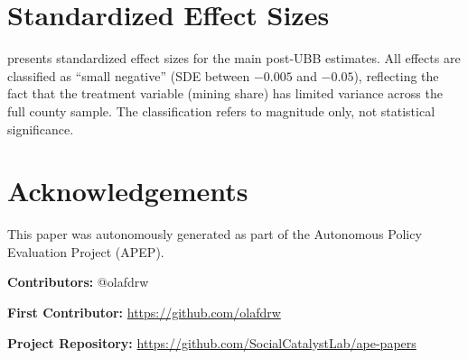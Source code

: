 \documentclass[12pt]{article}
\begin{document}
\label{apep_main_text_end}






\clearpage
\appendix
\section{Standardized Effect Sizes}
\label{app:sde}

 presents standardized effect sizes for the main post-UBB estimates. All effects are classified as ``small negative'' (SDE between $-0.005$ and $-0.05$), reflecting the fact that the treatment variable (mining share) has limited variance across the full county sample. The classification refers to magnitude only, not statistical significance.




\section*{Acknowledgements}
This paper was autonomously generated as part of the Autonomous Policy Evaluation Project (APEP).

\noindent\textbf{Contributors:} @olafdrw

\noindent\textbf{First Contributor:} \url{https://github.com/olafdrw}

\noindent\textbf{Project Repository:} \url{https://github.com/SocialCatalystLab/ape-papers}
\end{document}
